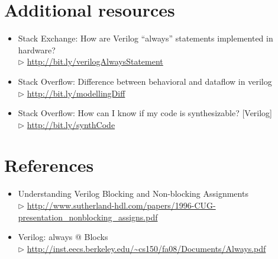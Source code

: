\documentclass[a4paper,10pt]{article}
\theoremstyle{mytheor}
\newcommand{\amurl}[1]{%
  {\color{blue}\url{#1}}
}
\begin{document}
\section*{Additional resources}
\begin{itemize}
  \small 
\item Stack Exchange: How are Verilog ``always'' statements implemented
  in hardware? \\$\rhd$ \amurl{http://bit.ly/verilogAlwaysStatement}
\item Stack Overflow: Difference between behavioral and dataflow in
  verilog \\$\rhd$ \amurl{http://bit.ly/modellingDiff}
\item Stack Overflow: How can I know if my code is synthesizable?
  [Verilog] \\$\rhd$ \amurl{http://bit.ly/synthCode}
\end{itemize} 

\section*{References}
\begin{itemize}
  \small
\item Understanding Verilog Blocking and Non-blocking Assignments
  \\$\rhd$
  \amurl{http://www.sutherland-hdl.com/papers/1996-CUG-presentation_nonblocking_assigns.pdf}
\item Verilog: always @ Blocks \\$\rhd$
  \amurl{http://inst.eecs.berkeley.edu/~cs150/fa08/Documents/Always.pdf}
\end{itemize}
\end{document}
